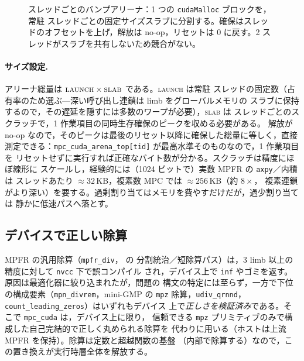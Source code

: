 \documentclass[uplatex,dvipdfmx,a4paper,11pt]{jsarticle}
\newcommand{\code}[1]{\texttt{#1}}
\begin{document}
\begin{figure}[h]
\centering
{}
\caption{スレッドごとのバンプアリーナ：1 つの \code{cudaMalloc} ブロックを，常駐
スレッドごとの固定サイズスラブに分割する。確保はスレッドのオフセットを上げ，解放は
no-op，リセットは 0 に戻す。2 スレッドがスラブを共有しないため競合がない。}
\label{fig:arena}
\end{figure}

\paragraph{サイズ設定.}
アリーナ総量は $\textsc{launch}\times\textsc{slab}$ である。\textsc{launch} は常駐
スレッドの固定数（占有率のため選ぶ---深い呼び出し連鎖は limb をグローバルメモリの
スラブに保持するので，その遅延を隠すには多数のワープが必要），\textsc{slab} は
スレッドごとのスクラッチで，1 作業項目の同時生存確保のピークを収める必要がある。
解放が no-op なので，そのピークは最後のリセット以降に確保した総量に等しく，直接
測定できる：\code{mpc\_cuda\_arena\_top[tid]} が最高水準そのものなので，1 作業項目を
リセットせずに実行すれば正確なバイト数が分かる。スクラッチは精度にほぼ線形に
スケールし，経験的には（1024 ビットで）実数 MPFR の \code{axpy}／内積は
スレッドあたり $\approx 32$\,KB，複素数 MPC では $\approx 256$\,KB（約 $8\times$，
複素連鎖がより深い）を要する。過剰割り当てはメモリを費やすだけだが，過少割り当ては
静かに低速パスへ落とす。

\subsection{デバイスで正しい除算}
\label{sec:div}

MPFR の汎用除算（\code{mpfr\_div}，\cite{HarveyZimmermann,MollerGranlund} の
分割統治／短除算パス）は，3 limb 以上の精度に対して \code{nvcc} 下で誤コンパイル
され，デバイス上で \code{inf} やゴミを返す。原因は最適化器に絞り込まれたが，問題の
構文の特定には至らず，一方で下位の構成要素（\code{mpn\_divrem}，mini-GMP の
\code{mpz} 除算，\code{udiv\_qrnnd}，\code{count\_leading\_zeros}）はいずれもデバイス
上で\emph{正しさを検証済み}である。そこで \code{mpc\_cuda} は，デバイス上に限り，
信頼できる \code{mpz} プリミティブのみで構成した自己完結的で正しく丸められる除算を
代わりに用いる（ホストは上流 MPFR を保持）。除算は定数と超越関数の基盤
（内部で除算する）なので，この置き換えが実行時層全体を解放する。
\end{document}
